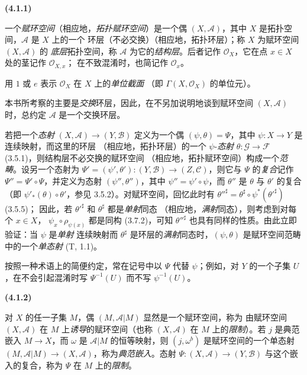 \documentclass[UTF8,fontset=none,11pt,oneside,openany]{ctexbook}
\newenvironment{env}[1][]{%
  \par\medskip\noindent\textbf{(#1)}\ %
}{\par}
\newcommand{\oldpage}[2][]{%
  \hypertarget{ega-source-page-#1-#2}{}%
  \marginnote{\scriptsize\textbf{#1}~|~#2}\ignorespaces}
\let\EGAOriginalLabel\label
\renewcommand{\label}[1]{\phantomsection\EGAOriginalLabel{#1}}
\begin{document}
\begin{env}[4.1.1]
\label{0.4.1.1-fr}
一个\emph{赋环空间}（相应地，\emph{拓扑赋环空间}）是一个偶
$(X,\mathcal{A})$，其中 $X$ 是拓扑空间，$\mathcal{A}$ 是 $X$ 上的一个
环层（不必交换）（相应地，拓扑环层）；称 $X$ 为赋环空间
$(X,\mathcal{A})$ 的
\oldpage[0\textsubscript{I}]{36}
\emph{底层}拓扑空间，称 $\mathcal{A}$ 为它的\emph{结构层}。后者记作
$\mathcal{O}_X$，它在点 $x\in X$ 处的茎记作 $\mathcal{O}_{X,x}$；
在不致混淆时，也简记作 $\mathcal{O}_x$。

用 $1$ 或 $e$ 表示 $\mathcal{O}_X$ 在 $X$ 上的\emph{单位截面}
（即 $\Gamma(X,\mathcal{O}_X)$ 的单位元）。

本书所考察的主要是\emph{交换}环层，因此，在不另加说明地谈到赋环空间
$(X,\mathcal{A})$ 时，总约定 $\mathcal{A}$ 是一个交换环层。

若把一个\emph{态射} $(X,\mathcal{A})\to(Y,\mathcal{B})$ 定义为一个偶
$(\psi,\theta)=\Psi$，其中 $\psi:X\to Y$ 是连续映射，而这里的环层
（相应地，拓扑环层）的一个 $\psi$-\emph{态射}
$\theta:\mathcal{G}\to\mathcal{F}$ (3.5.1)，则结构层不必交换的赋环空间
（相应地，拓扑赋环空间）构成一个\emph{范畴}。设另一个态射为
$\Psi'=(\psi',\theta'):(Y,\mathcal{B})\to(Z,\mathcal{C})$，则它与
$\Psi$ 的\emph{复合}记作 $\Psi''=\Psi'\circ\Psi$，并定义为态射
$(\psi'',\theta'')$，其中 $\psi''=\psi'\circ\psi$，而 $\theta''$ 是
$\theta$ 与 $\theta'$ 的复合（即
$\psi'_*(\theta)\circ\theta'$，参见 3.5.2）。对赋环空间，回忆此时有
$\theta''^\sharp=\theta^\sharp\circ\psi^*(\theta'^\sharp)$ (3.5.5)；
因此，若 $\theta'^\sharp$ 和 $\theta^\sharp$ 都是\emph{单射}同态
（相应地，\emph{满射}同态），则考虑到对每个 $x\in X$，
$\psi_x\circ\rho_{\psi(x)}$ 都是同构 (3.7.2)，可知
$\theta''^\sharp$ 也具有同样的性质。由此立即验证：当 $\psi$ 是\emph{单射}
连续映射而 $\theta^\sharp$ 是环层的\emph{满射}同态时，$(\psi,\theta)$
是赋环空间范畴中的一个\emph{单态射} (T, 1.1)。

按照一种术语上的简便约定，常在记号中以 $\Psi$ 代替 $\psi$；例如，对
$Y$ 的一个子集 $U$，在不会引起混淆时写 $\Psi^{-1}(U)$ 而不写
$\psi^{-1}(U)$。
\end{env}

\begin{env}[4.1.2]
\label{0.4.1.2-fr}
对 $X$ 的任一子集 $M$，偶 $(M,\mathcal{A}|M)$ 显然是一个赋环空间，称为
由赋环空间 $(X,\mathcal{A})$ 在 $M$ 上\emph{诱导}的赋环空间（也称
$(X,\mathcal{A})$ 在 $M$ 上的\emph{限制}）。若 $j$ 是典范嵌入
$M\to X$，而 $\omega$ 是 $\mathcal{A}|M$ 的恒等映射，则
$(j,\omega^b)$ 是赋环空间的一个单态射
$(M,\mathcal{A}|M)\to(X,\mathcal{A})$，称为\emph{典范嵌入}。态射
$\Psi:(X,\mathcal{A})\to(Y,\mathcal{B})$ 与这个嵌入的复合，称为
$\Psi$ 在 $M$ 上的\emph{限制}。
\end{env}
\end{document}
